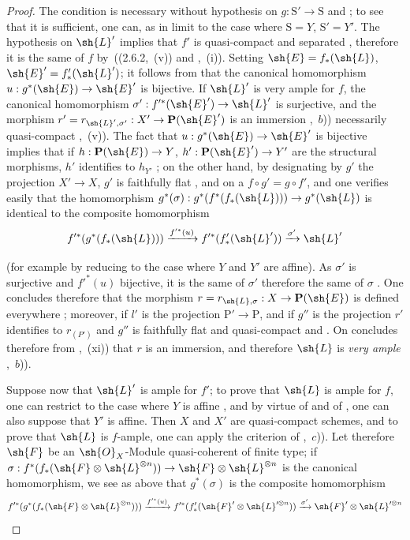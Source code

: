 \begin{proof}
The condition is necessary without hypothesis on $g:\mathrm{S}'\to\mathrm{S}$  and ;
to see that it is sufficient, one can, as in  limit to the case where $\mathrm{S}=Y$,
$\mathrm{S}'=Y'$. The hypothesis on $\sh{L}'$ implies that $f'$ is quasi-compact and separated ,
therefore it is the same of $f$ by~((2.6.2,~(v)) and ,~(i)). Setting $\sh{E}=f_*(\sh{L})$, $\sh{E}'=f'_*(\sh{L}')$;
it follows from  that the canonical homomorphism $u:g^*(\sh{E})\to\sh{E}'$ is bijective. If $\sh{L}'$
is very ample for $f$, the canonical homomorphism $\sigma':f'^*(\sh{E}')\to\sh{L}'$ is surjective, and the
morphism $r'=r_{\sh{L}',\sigma'}:X'\to\mathbf{P}(\sh{E}')$ is an immersion
,~$b$)) necessarily
quasi-compact ,~(v)). The fact that $u:g^*(\sh{E})\to\sh{E}'$ is bijective implies that if
$h:\mathbf{P}(\sh{E})\to Y$, $h':\mathbf{P}(\sh{E}')\to Y'$ are the structural morphisms, $h'$ identifies to $h_{Y'}$
; on the other hand, by designating by $g'$ the projection $X'\to X$, $g'$ is faithfully
flat , and on a $f\circ g'=g\circ f'$, and one verifies easily that the homomorphism
$g^*(\sigma):g^*(f^*(f_*(\sh{L})))\to g^*(\sh{L})$ is identical to the composite homomorphism
\[
  f'^*(g^*(f_*(\sh{L}))) \xrightarrow{f'^*(u)} f'^*(f'_*(\sh{L}')) \xrightarrow{\sigma'} \sh{L}'
\]

(for example by reducing to the case where $Y$ and $Y'$ are affine). As $\sigma'$ is surjective
and $f'^*(u)$ bijective, it is the same of $\sigma'$ therefore the same of $\sigma$ .
One concludes therefore that the morphism $r=r_{\sh{L},\sigma}:X\to\mathbf{P}(\sh{E})$ is defined everywhere ;
moreover, if $l'$ is the projection $\mathrm{P}'\to\mathrm{P}$, and if $g''$ is the
projection $r'$ identifies to $r_{(P')}$  and $g''$ is faithfully flat
and quasi-compact  and . On
concludes therefore from ,~(xi)) that $r$ is an immersion, and therefore $\sh{L}$ is \emph{very ample}
,~$b$)).

Suppose now that $\sh{L}'$ is ample for $f'$; to prove that $\sh{L}$ is ample
for $f$, one can restrict to the case where $Y$ is affine , and by virtue of  and
of , one can also suppose that $Y'$ is affine. Then $X$ and $X'$ are
quasi-compact schemes, and to prove that $\sh{L}$ is $f$-ample, one can apply the
criterion of ,~$c$)). Let therefore $\sh{F}$ be an $\sh{O}_X$-Module quasi-coherent of finite type;
if $\sigma:f^*(f_*(\sh{F}\otimes\sh{L}^{\otimes n}))\to\sh{F}\otimes\sh{L}^{\otimes n}$ is the canonical homomorphism, we see as
above that $g^*(\sigma)$ is the composite homomorphism
\[
  f'^*(g^*(f_*(\sh{F}\otimes\sh{L}^{\otimes n}))) \xrightarrow{f'^*(u)} f'^*(f'_*(\sh{F}'\otimes\sh{L}'^{\otimes n})) \xrightarrow{\sigma'} \sh{F}'\otimes\sh{L}'^{\otimes n}
\]


\end{proof}
